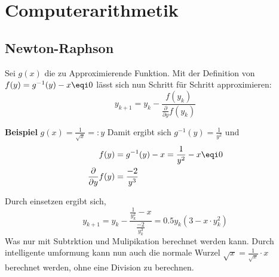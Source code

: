 \section{Computerarithmetik}
\subsection{Newton-Raphson}
Sei $g(x)$ die zu Approximierende Funktion. Mit der Definition von $f(y) = g^{-1}(y) - x \eqi 0$ lässt sich nun Schritt für Schritt approximieren:
\[
y_{k+1} = y_k - \frac{f(y_k)}{\frac{\partial}{\partial y}f(y_k)}
\]

\textbf{Beispiel} $g(x) = \frac{1}{\sqrt{x}} =: y$
Damit ergibt sich $g^{-1}(y) = \frac{1}{y^2}$ und 
\begin{align*}
	f(y) &= g^{-1}(y) - x = \frac{1}{y^2} - x \eqi 0 \\
	\frac{\partial}{\partial y}f(y) &= \frac{-2}{y^3}
\end{align*}

Durch einsetzen ergibt sich,
\[
y_{k+1} = y_k - \frac{\frac{1}{y_k^2} - x}{\frac{-2}{y_k^3}} = 0.5y_k(3 - x\cdot y_k^2)
\]
Was nur mit Subtrktion und Mulipikation berechnet werden kann. Durch intelligente umformung kann nun auch die normale Wurzel $\sqrt{x} = \frac{1}{\sqrt{x}}\cdot x$ berechnet werden, ohne eine Division zu berechnen.
